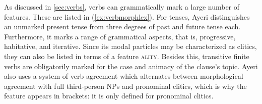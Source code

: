 \begin{morphlex}
\ex\label{ex:verbmorphlex}%
\xe
\end{morphlex}

As discussed in \autoref{sec:verbs}, verbs can grammatically mark a large
number of features. These are listed in (\ref{ex:verbmorphlex}). For tenses,
Ayeri distinguishes an unmarked present tense from three degrees of past and
future tense each. Furthermore, it marks a range of grammatical aspects,
that is, progressive, habitative, and iterative. Since its modal particles may
be characterized as clitics, they can also be listed in terms of a feature
\Mod\textsc{ality}. Besides this, transitive finite verbs are obligatorily
marked for the case and animacy of the clause's topic. Ayeri also uses a system
of verb agreement which alternates between morphological agreement with
full third-person NPs and pronominal clitics, which is why the feature 
\ups{\Subj{} \Pred} appears in brackets: it is only defined for pronominal
clitics.

